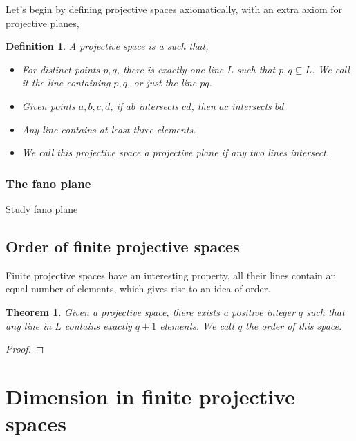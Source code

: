 \documentclass[12pt]{article}
\newtheorem{theorem}{Theorem}
\newtheorem{definition}{Definition}
\begin{document}
    Let's begin by defining projective spaces axiomatically, with an extra axiom for projective planes,

    \begin{definition}
        A projective space is a such that,
        \begin{itemize}
            \item For distinct points $p, q$, there is exactly one line $L$ such that ${p,q} \subseteq L$.
            We call it the line containing $p, q$, or just the line $pq$.
            \item Given points $a,b,c,d$, if $ab$ intersects $cd$, then $ac$ intersects $bd$
            \item Any line contains at least three elements.
            \item We call this projective space a projective plane if any two lines intersect.
        \end{itemize}
    \end{definition}

    \subsubsection{The fano plane}

    Study fano plane

    \subsection{Order of finite projective spaces}

    Finite projective spaces have an interesting property, all their lines contain an equal number of elements, which gives rise to an idea of order.

    \begin{theorem}
        Given a projective space, there exists a positive integer $q$ such that any line in $L$ contains exactly $q+1$ elements.
        We call q the order of this space.
    \end{theorem}

    \begin{proof}
    \end{proof}

    \section{Dimension in finite projective spaces}
\end{document}
